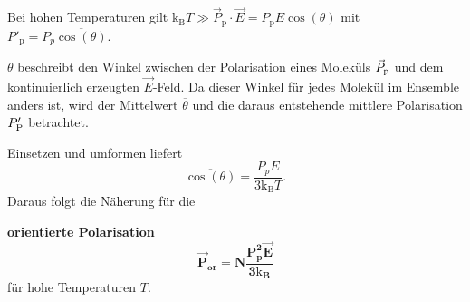     Bei hohen Temperaturen gilt $\mathrm{k}_{\mathrm{B}}T\gg \vec{P}_{\text{p}}\cdot\vec{E} = P_\text{p} E \cos\left( \theta \right) $ mit $P'_{\text{p}}= P_{p} \overline{\cos\left( \theta \right) }$.
    \begin{verbal}
        $\theta$ beschreibt den Winkel zwischen der Polarisation eines Moleküls $\vec P_\text p$ und dem kontinuierlich erzeugten $\vec E$-Feld. Da dieser Winkel für jedes Molekül im Ensemble anders ist, wird der Mittelwert $\overline\theta$ und die daraus entstehende mittlere Polarisation $P_\text P'$ betrachtet.
    \end{verbal}
    Einsetzen und umformen liefert $$\overline{\cos\left( \theta \right) }= \frac{P_{p} E}{ 3 \mathrm{k}_{\mathrm{B}}T}.$$ Daraus folgt die Näherung für die 
    \begin{important}
        \textbf{orientierte Polarisation}\\
        \begin{equation}
        	\bm{\vec{P}_{\textbf{or}}= N \frac{P_\textbf{p}^2 \vec{E}}{3 \mathrm{k}_{\textbf{B}}}}
        	\label{eq:2.16}
        \end{equation}
        für hohe Temperaturen $T$.
    \end{important}
    
